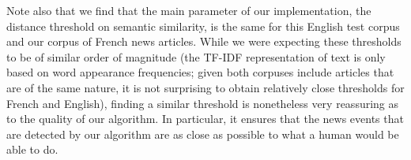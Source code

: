 %
%


Note also that we find that the main parameter of our implementation, the distance threshold on semantic similarity, is the same for this English test corpus and our corpus of French news articles. While we were expecting these thresholds to be of similar order of magnitude (the TF-IDF representation of text is only based on word appearance frequencies; given both corpuses include articles that are of the same nature, it is not surprising to obtain relatively close thresholds for French and English), finding a similar threshold is nonetheless very reassuring as to the quality of our algorithm. In particular, it ensures that the news events that are detected by our algorithm are as close as possible to what a human would be able to do.



